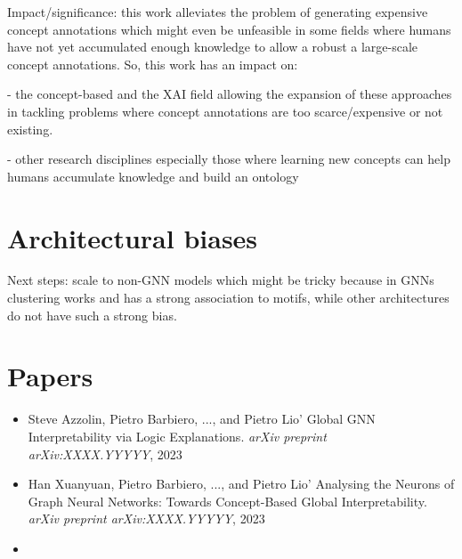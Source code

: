 Impact/significance: this work alleviates the problem of generating expensive concept annotations which might even be unfeasible in some fields where humans have not yet accumulated enough knowledge to allow a robust a large-scale concept annotations. So, this work has an impact on:

- the concept-based and the XAI field allowing the expansion of these approaches in tackling problems where concept annotations are too scarce/expensive or not existing.

- other research disciplines especially those where learning new concepts can help humans accumulate knowledge and build an ontology

\section{Architectural biases}
Next steps: scale to non-GNN models which might be tricky because in GNNs clustering works and has a strong association to motifs, while other architectures do not have such a strong bias.

\section*{Papers}
\nobibliography*
\begin{itemize}
    \item Steve Azzolin, Pietro Barbiero, ..., and Pietro Lio' Global GNN Interpretability via Logic Explanations. \textit{arXiv preprint arXiv:XXXX.YYYYY}, 2023
    \item Han Xuanyuan, Pietro Barbiero, ..., and Pietro Lio' Analysing the Neurons of Graph Neural Networks: Towards Concept-Based Global Interpretability. \textit{arXiv preprint arXiv:XXXX.YYYYY}, 2023
    \item {}
\end{itemize}
